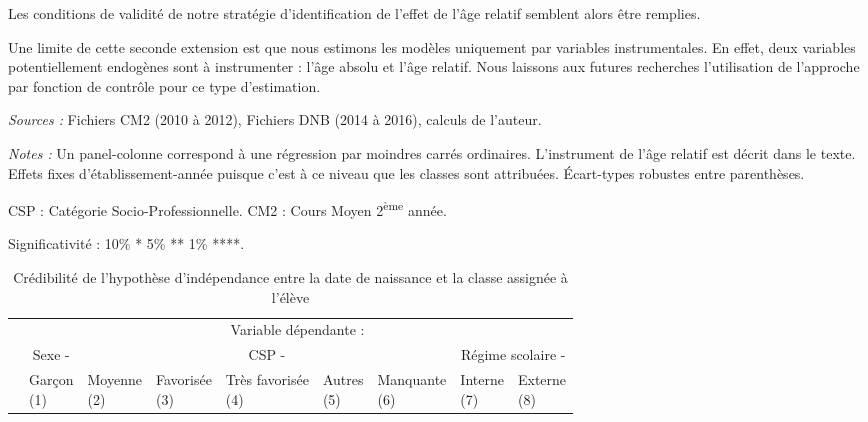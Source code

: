 \documentclass[
]{book}
\begin{document}
Les conditions de validité de notre stratégie d'identification de l'effet de l'âge relatif semblent alors être remplies.

Une limite de cette seconde extension est que nous estimons les modèles uniquement par variables instrumentales. En effet, deux variables potentiellement endogènes sont à instrumenter : l'âge absolu et l'âge relatif. Nous laissons aux futures recherches l'utilisation de l'approche par fonction de contrôle pour ce type d'estimation.

\newpage
\begingroup\fontsize{8}{10}\selectfont

\begin{ThreePartTable}
\begin{TableNotes}
\item \textit{Sources :} Fichiers CM2 (2010 à 2012), Fichiers DNB (2014 à 2016), calculs de l'auteur.
\item \textit{Notes :} Un panel-colonne correspond à une régression par moindres carrés ordinaires. L'instrument de l'âge relatif est décrit dans le texte. Effets fixes d'établissement-année puisque c'est à ce niveau que les classes sont attribuées. Écart-types robustes entre parenthèses.
\item CSP : Catégorie Socio-Professionnelle. CM2 : Cours Moyen 2\textsuperscript{ème} année.
\item Significativité : 10\% * 5\% ** 1\% ****.
\end{TableNotes}
\begin{longtable}[t]{lllllllll}
\caption{\label{tab:ageexoinstagerel}Crédibilité de l'hypothèse d'indépendance entre la date de naissance et la classe assignée à l'élève}\\
\toprule
\multicolumn{1}{c}{} & \multicolumn{8}{c}{Variable dépendante : } \\
\cmidrule(l{3pt}r{3pt}){2-9}
\multicolumn{1}{c}{} & \multicolumn{1}{c}{Sexe - } & \multicolumn{5}{c}{CSP - } & \multicolumn{2}{c}{Régime scolaire - } \\
\cmidrule(l{3pt}r{3pt}){2-2} \cmidrule(l{3pt}r{3pt}){3-7} \cmidrule(l{3pt}r{3pt}){8-9}
 & \makecell{Garçon \\ (1) } & \makecell{Moyenne \\ (2) } & \makecell{Favorisée \\ (3) } & \makecell{Très favorisée \\ (4) } & \makecell{Autres \\ (5) } & \makecell{Manquante \\ (6) } & \makecell{Interne \\ (7) } & \makecell{Externe \\ (8) }\\

\end{longtable}
\end{ThreePartTable}
\end{document}

